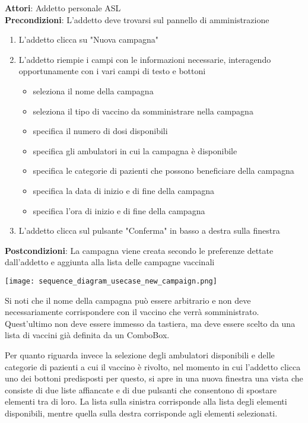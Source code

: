 \documentclass{article}
\begin{document}
\begin{framed}
    \noparskip{}
    \textbf{Attori}: Addetto personale ASL\\
    \textbf{Precondizioni}: L'addetto deve trovarsi sul pannello di amministrazione
    \begin{enumerate}
        \item L'addetto clicca su "Nuova campagna"
        \item L'addetto riempie i campi con le informazioni necessarie, interagendo opportunamente  con i vari campi di testo e bottoni
            \begin{itemize}
                \item seleziona il nome della campagna
                \item seleziona il tipo di vaccino da somministrare nella campagna
                \item specifica il numero di dosi disponibili
                \item specifica gli ambulatori in cui la campagna è disponibile
                \item specifica le categorie di pazienti che possono beneficiare della campagna
                \item specifica la data di inizio e di fine della campagna
                \item specifica l'ora di inizio e di fine della campagna
            \end{itemize}
        \item L'addetto clicca sul pulsante "Conferma" in basso a destra sulla finestra
    \end{enumerate}
    \textbf{Postcondizioni}: La campagna viene creata secondo le preferenze dettate dall'addetto e  aggiunta alla lista delle campagne vaccinali
\end{framed}

\begin{center}
    \texttt{[image: sequence\_diagram\_usecase\_new\_campaign.png]}
\end{center}

Si noti che il nome della campagna può essere arbitrario e non deve necessariamente corrispondere con il vaccino che verrà somministrato. Quest'ultimo non deve essere immesso da tastiera, ma deve essere scelto da una lista di vaccini già definita da un ComboBox.

Per quanto riguarda invece la selezione degli ambulatori disponibili e delle categorie di pazienti a cui il vaccino è rivolto, nel momento in cui l'addetto clicca uno dei bottoni predisposti per questo, si apre in una nuova finestra una vista che consiste di due liste affiancate e di due pulsanti che consentono di spostare elementi tra di loro. La lista sulla sinistra corrisponde alla lista degli elementi disponibili, mentre quella sulla destra corrisponde agli elementi selezionati.
\end{document}

